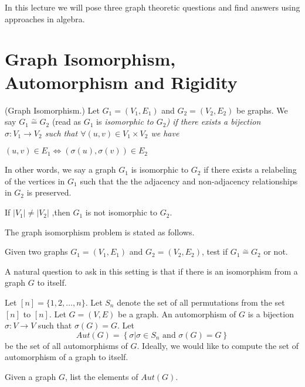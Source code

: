 
In this lecture we will pose three graph theoretic questions and find answers using approaches in algebra.

\section{Graph Isomorphism, Automorphism and Rigidity}

\begin{definition}(Graph Isomorphism.)
Let $G_1=(V_1,E_1)$ and $G_2=(V_2,E_2)$ be graphs. We say $G_1\stackrel{\sim}{=}G_2$ (read as $G_1$ is \em isomorphic to $G_2$) if there exists a bijection $\sigma : V_1\rightarrow V_2$ such that $\forall (u,v) \in V_1\times V_2$ we have

\begin{center}
$(u,v)\in E_1 \iff (\sigma(u),\sigma(v))\in E_2$
\end{center}
\end{definition}

In other words, we say a graph $G_1$ is isomorphic to $G_2$ if there exists a relabeling of the vertices in $G_1$  such that the the adjacency and non-adjacency relationships in $G_2$ is preserved. 
\begin{observation}
If $|V_1|\neq |V_2|$ ,then $G_1$ is not isomorphic to $G_2$.

\end{observation}

The graph isomorphism problem is stated as follows. 

\begin{problem}
Given two graphs $G_1=(V_1,E_1)$ and $G_2=(V_2,E_2)$, test if $G_1\stackrel{\sim}{=}G_2$ or not.
\end{problem}

A natural question to ask in this setting is that if there is an isomorphism from a graph $G$ to itself. 

Let $[n]=\{1,2,\ldots,n\}$. Let $S_n$ denote the set of all permutations from the set $[n]$ to $[n]$. Let $G=(V,E)$ be a graph. An automorphism of $G$ is a bijection $\sigma:V\rightarrow V$ such that $\sigma(G)= G$. Let
$$Aut(G)= \left\{\sigma | \sigma\in S_n \text{~and~} \sigma(G)= G \right\}$$
be the set of all automorphisms of $G$. Ideally, we would like to compute the set of automorphism of a graph to itself.

\begin{problem}
Given a graph $G$, list the elements of $Aut(G)$.
\end{problem}


